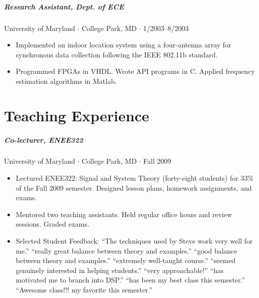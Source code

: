 \documentclass[10pt,letterpaper]{article}
\begin{document}
\subparagraph{Research Assistant, Dept. of ECE}
University of Maryland $\cdot$ College Park, MD $\cdot$ 1/2003--8/2003
\begin{itemize}
	\item Implemented an indoor location system using a four-antenna array for synchronous data collection following the IEEE 802.11b standard.
	\item Programmed FPGAs in VHDL. Wrote API programs in C.  Applied frequency estimation algorithms in Matlab.
\end{itemize}






\section*{Teaching Experience}

\subparagraph{Co-lecturer, ENEE322}
University of Maryland $\cdot$ College Park, MD $\cdot$ Fall 2009
\begin{itemize}
\item Lectured ENEE322: Signal and System Theory (forty-eight students) for 33\% of the Fall 2009 semester. Designed lesson plans, homework assignments, and exams.
\item Mentored two teaching assistants. Held regular office hours and review sessions. Graded exams.
\item Selected Student Feedback: ``The techniques used by Steve work very well for me.'' ``really great balance between theory and examples.'' ``good balance between theory and examples.'' ``extremely well-taught course.'' ``seemed genuinely interested in helping students.'' ``very approachable!'' ``has motivated me to branch into DSP.'' ``has been my best class this semester.'' ``Awesome class!!! my favorite this semester.''
\end{itemize}
\end{document}
